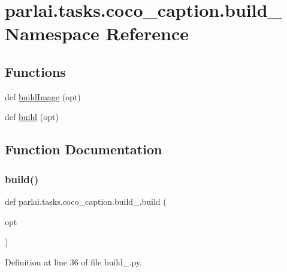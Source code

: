\hypertarget{namespaceparlai_1_1tasks_1_1coco__caption_1_1build__2015}{}\section{parlai.\+tasks.\+coco\+\_\+caption.\+build\+\_ Namespace Reference}
\label{namespaceparlai_1_1tasks_1_1coco__caption_1_1build__2015}
\subsection*{Functions}
\begin{DoxyCompactItemize}
\item 
def \hyperlink{namespaceparlai_1_1tasks_1_1coco__caption_1_1build__2015_a52edd896124184ec02d76b23368557aa}{build\+Image} (opt)
\item 
def \hyperlink{namespaceparlai_1_1tasks_1_1coco__caption_1_1build__2015_aa6b66a784b4f4fe03e5cb84f1195dc69}{build} (opt)
\end{DoxyCompactItemize}


\subsection{Function Documentation}
\mbox{\label{namespaceparlai_1_1tasks_1_1coco__caption_1_1build__2015_aa6b66a784b4f4fe03e5cb84f1195dc69}} 
\subsubsection{\texorpdfstring{build()}{build()}}
{\footnotesize\ttfamily def parlai.\+tasks.\+coco\+\_\+caption.\+build\+\_.\+build (\begin{DoxyParamCaption}\item[{}]{opt }\end{DoxyParamCaption})}



Definition at line 36 of file build\+\_.\+py.

\mbox{\label{namespaceparlai_1_1tasks_1_1coco__caption_1_1build__2015_a52edd896124184ec02d76b23368557aa}} 
